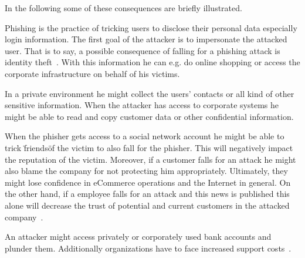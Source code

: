 In the following some of these consequences are briefly illustrated.

\begin{description}[leftmargin=0cm]
	\item[Identity Theft:] Phishing is the practice of tricking users to disclose their personal data especially login information. The first goal of the attacker is to impersonate the attacked user. That is to say, a possible consequence of falling for a phishing attack is identity theft~\cite{jakobsson2006phishing}. With this information he can e.g. do online shopping or access the corporate infrastructure on behalf of his victims.
	\item[Data theft:]
	 In a private environment he might collect the users' contacts or all kind of other sensitive information.
When the attacker has access to corporate systems he might be able to read and copy customer data or other confidential information.
 	\item[Reputational Damage:]
 	When the phisher gets access to a social network account he might be able to trick \"friends\" of the victim to also fall for the phisher. This will negatively impact the reputation of the victim.
 	 Moreover, if a customer falls for an attack he might also blame the company for not protecting him appropriately. 
 	 Ultimately, they might lose confidence in eCommerce operations and the Internet in general.
 	 On the other hand, if a employee falls for an attack and this news is published this alone will decrease the trust of potential and current customers in the attacked company~\cite{mcafee, redcondor}. 
	\item[Financial Loss:]
	An attacker might access privately or corporately used bank accounts and plunder them. Additionally organizations have to face increased support costs~\cite{rsa2013, mcafee}.
\end{description}
 

